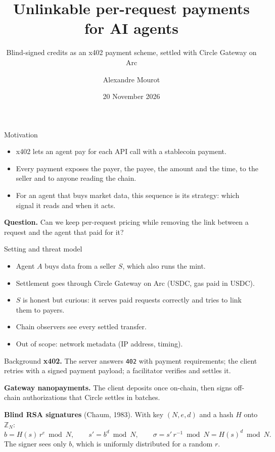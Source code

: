 \documentclass[aspectratio=169,11pt]{beamer}
\title{Unlinkable per-request payments for AI agents}
\subtitle{Blind-signed credits as an x402 payment scheme, settled with Circle Gateway on Arc}
\author{Alexandre Mourot}
\institute{EPFL \\ UBC Hackathon 2026, Agentic Payments track}
\date{20 November 2026}
\begin{document}
\begin{frame}
  \titlepage
\end{frame}

\begin{frame}{Motivation}
  \begin{itemize}
    \item x402 lets an agent pay for each API call with a stablecoin payment.
    \item Every payment exposes the payer, the payee, the amount and the time, to the seller and to anyone reading the chain.
    \item For an agent that buys market data, this sequence is its strategy: which signal it reads and when it acts.
  \end{itemize}
  \pause
  \vspace{1em}
  \textbf{Question.} Can we keep per-request pricing while removing the link between a request and the agent that paid for it?
\end{frame}

\begin{frame}{Setting and threat model}
  \begin{itemize}
    \item Agent $A$ buys data from a seller $S$, which also runs the mint.
    \item Settlement goes through Circle Gateway on Arc (USDC, gas paid in USDC).
    \item $S$ is honest but curious: it serves paid requests correctly and tries to link them to payers.
    \item Chain observers see every settled transfer.
    \item Out of scope: network metadata (IP address, timing).
  \end{itemize}
\end{frame}

\begin{frame}{Background}
  \textbf{x402.} The server answers \texttt{402} with payment requirements; the client retries with a signed payment payload; a facilitator verifies and settles it.
  \medskip

  \textbf{Gateway nanopayments.} The client deposits once on-chain, then signs off-chain authorizations that Circle settles in batches.
  \pause
  \medskip

  \textbf{Blind RSA signatures} (Chaum, 1983). With key $(N, e, d)$ and a hash $H$ onto $\mathbb{Z}_N$:
  \[
    b = H(s)\, r^{e} \bmod N, \qquad
    s' = b^{d} \bmod N, \qquad
    \sigma = s'\, r^{-1} \bmod N = H(s)^{d} \bmod N.
  \]
  The signer sees only $b$, which is uniformly distributed for a random $r$.
\end{frame}
\end{document}
